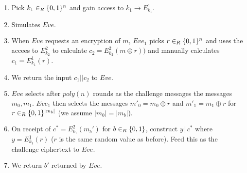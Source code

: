 \documentclass{article}
\begin{document}
\begin{enumerate}
\begin{enumerate}[noitemsep,topsep=\mdcompacttopsep,start=0]%

\item{}Pick $k_1 \in_R \{0,1\}^n$ and gain access to $k_1 \to E^1_{k_1}$.%

\item{}Simulates $Eve$.%

\item{}When $Eve$ requests an encryption of $m$, $Eve_1$ picks $r \in_R \{0,1\}^{n}$ and uses the 
accees to $E^2_{k_2}$ to calculate
$c_2 = E^2_{k_2}(m \oplus r))$ and manually calculates $c_1 = E^1_{k_1}(r)$.%

\item{}We return the input $c_1 || c_2$ to $Eve$.%

\item{}$Eve$ selects after $poly(n)$ rounds as the challenge
messages the messages $m_0, m_1$. $Eve_1$ then selects the messages $m'_0 = m_0 \oplus r$ and $m'_1 = m_1 \oplus r$
for $r \in_R \{0,1\}^{|m_b|}$ (we assume $|m_0| = |m_b|$).%

\item{}On receipt of $c^* = E^2_{k_1}(m_b')$ for $b \in_R \{0,1\}$, construct $y||c^*$ where 
$y = E^1_{k_1}(r)$ ($r$ is the same random value as before). Feed this as the challenge ciphertext to $Eve$.%

\item{}We return $b'$ returned by $Eve$.%
\end{enumerate}%


\end{enumerate}
\end{document}
